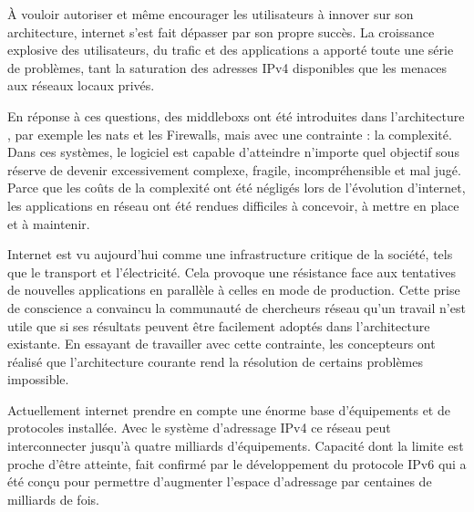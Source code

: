 À vouloir autoriser et même encourager les utilisateurs à innover sur son architecture, internet s'est fait dépasser par son propre succès. La croissance explosive des utilisateurs, du trafic et des applications a apporté toute une série de problèmes, 
tant la saturation des adresses IPv4 disponibles que les menaces aux réseaux locaux privés. 

\par
En réponse à ces questions, des \glspl{middlebox} ont été introduites dans l'architecture , par exemple les \glspl{nat} et les Firewalls, mais avec une contrainte : la complexité. Dans ces systèmes, le logiciel est capable d'atteindre n'importe quel objectif sous réserve de devenir excessivement complexe, fragile, incompréhensible et mal jugé. Parce que les coûts de la complexité ont été négligés lors de l'évolution d'internet, les applications en réseau ont été rendues difficiles à concevoir, à mettre en place et à maintenir. \cite{InternetEvolutionRoleSoftwareEngineeringRealInternet}

Internet est vu aujourd'hui comme une infrastructure critique de la société, tels que le transport et l'électricité.  Cela provoque une résistance face aux tentatives de nouvelles applications en parallèle à celles en mode de production. 
Cette prise de conscience a convaincu la communauté de chercheurs réseau qu'un travail n'est utile que si ses résultats peuvent être facilement adoptés dans l'architecture existante. 
En essayant de travailler avec cette contrainte, les concepteurs ont réalisé que l'architecture courante rend la résolution de certains problèmes impossible. \cite{OpenFlowStanfordOssification} \cite{SurveySDNIntro}

Actuellement internet prendre en compte une énorme base d'équipements et de protocoles installée. Avec le système d'adressage IPv4 ce réseau peut interconnecter jusqu'à quatre milliards d'équipements. Capacité dont la limite est proche d'être atteinte, fait confirmé par le développement du protocole IPv6 qui a été conçu pour permettre d'augmenter l'espace d'adressage par centaines de milliards de fois. \cite{ICANNIPv6Important} 


